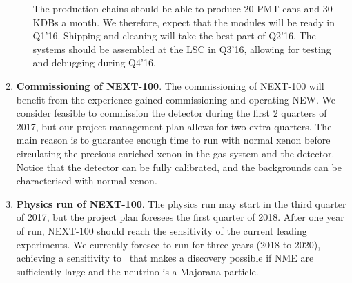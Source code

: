 \begin{enumerate}
\begin{enumerate}
The production chains should be able to produce 20 PMT cans and 30 KDBs a month. We therefore, expect that the modules will be ready in Q1'16. Shipping and cleaning will take the best part of Q2'16. The systems should be assembled at the LSC in Q3'16, allowing for testing and debugging during Q4'16.
\end{enumerate}

\item {\bf Commissioning of NEXT-100}. The commissioning of NEXT-100 will benefit from the experience gained commissioning and operating NEW. We consider feasible to commission the detector during the first 2 quarters of 2017, but our project management plan allows for two extra quarters. The main reason is to guarantee enough time to run with normal xenon before circulating the precious enriched xenon in the gas system and the detector. Notice that the detector can be fully calibrated, and the backgrounds can be characterised with normal xenon.  

\item {\bf Physics run of NEXT-100}. The physics run may start in the third quarter of 2017, but the project plan foresees the first quarter of 2018. After one year of run, NEXT-100 should reach the sensitivity of the current leading experiments. We currently foresee to run for three years (2018 to 2020), achieving a sensitivity to \mbb\ that makes a discovery possible if NME are sufficiently large and the neutrino is a Majorana particle. 

\end{enumerate}
